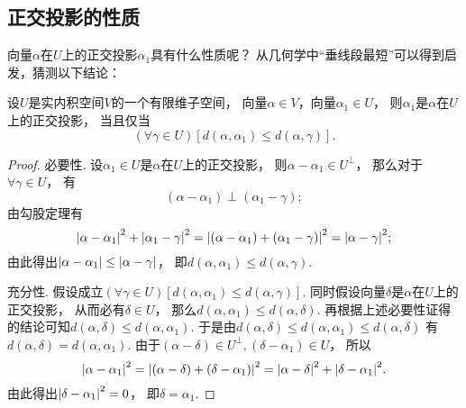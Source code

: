 \subsection{正交投影的性质}
向量\(\alpha\)在\(U\)上的正交投影\(\alpha_1\)具有什么性质呢？
从几何学中“垂线段最短”可以得到启发，猜测以下结论：
\begin{theorem}\label{theorem:正交补.垂线段最短}
设\(U\)是实内积空间\(V\)的一个有限维子空间，
向量\(\alpha \in V\)，向量\(\alpha_1 \in U\)，
则\(\alpha_1\)是\(\alpha\)在\(U\)上的正交投影，
当且仅当\begin{equation*}
	(\forall \gamma \in U)
	[d(\alpha,\alpha_1) \leq d(\alpha,\gamma)].
\end{equation*}
\begin{proof}
必要性.
设\(\alpha_1 \in U\)是\(\alpha\)在\(U\)上的正交投影，
则\(\alpha - \alpha_1 \in U^\perp\)，
那么对于\(\forall \gamma \in U\)，
有\begin{equation*}
	(\alpha - \alpha_1) \perp (\alpha_1 - \gamma);
\end{equation*}
由勾股定理有\begin{equation*}
	\abs{\alpha - \alpha_1}^2
	+ \abs{\alpha_1 - \gamma}^2
	= \abs{(\alpha - \alpha_1) + (\alpha_1 - \gamma)}^2
	= \abs{\alpha - \gamma}^2;
\end{equation*}
由此得出\(\abs{\alpha - \alpha_1} \leq \abs{\alpha - \gamma}\)，
即\(d(\alpha,\alpha_1) \leq d(\alpha,\gamma)\).

充分性.
假设成立\((\forall \gamma \in U)[d(\alpha,\alpha_1) \leq d(\alpha,\gamma)]\).
同时假设向量\(\delta\)是\(\alpha\)在\(U\)上的正交投影，
从而必有\(\delta \in U\)，
那么\(d(\alpha,\alpha_1) \leq d(\alpha,\delta)\).
再根据上述必要性证得的结论可知\(d(\alpha,\delta) \leq d(\alpha,\alpha_1)\).
于是由\(d(\alpha,\delta) \leq d(\alpha,\alpha_1) \leq d(\alpha,\delta)\)
有\(d(\alpha,\delta) = d(\alpha,\alpha_1)\).
由于\((\alpha-\delta) \in U^\perp,
(\delta-\alpha_1) \in U\)，
所以\begin{equation*}
	\abs{\alpha - \alpha_1}^2
	= \abs{(\alpha - \delta) + (\delta - \alpha_1)}^2
	= \abs{\alpha - \delta}^2 + \abs{\delta - \alpha_1}^2.
\end{equation*}
由此得出\(\abs{\delta - \alpha_1}^2 = 0\)，
即\(\delta = \alpha_1\).
\end{proof}
\end{theorem}

